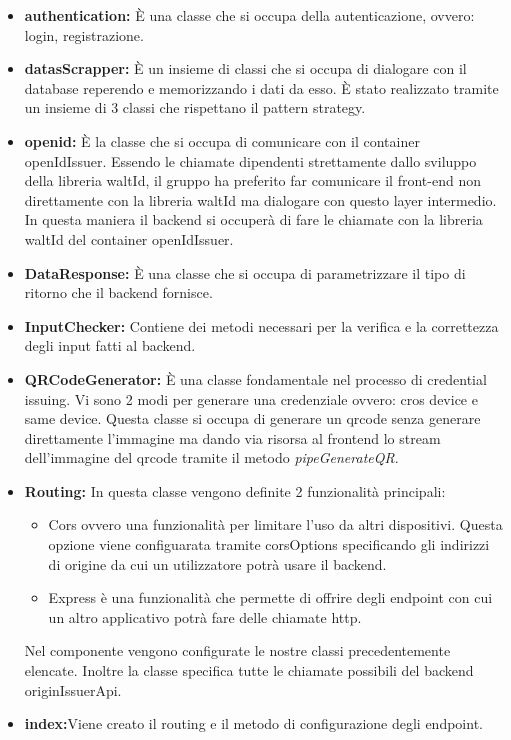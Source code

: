 \begin{itemize}
    \item \textbf{authentication:} È una classe che si occupa della autenticazione, ovvero: login, registrazione. 
    \item \textbf{datasScrapper:} È un insieme di classi che si occupa di dialogare con il database reperendo e memorizzando i dati da esso. È stato realizzato tramite un insieme di 3 classi che rispettano il pattern strategy. 
    \item \textbf{openid:} È la classe che si occupa di comunicare con il container openIdIssuer. Essendo le chiamate dipendenti strettamente dallo sviluppo della libreria waltId, il gruppo ha preferito far comunicare il front-end non direttamente con la libreria waltId ma dialogare con questo layer intermedio. In questa maniera il backend si occuperà di fare le chiamate con la libreria waltId del container openIdIssuer.
    \item \textbf{DataResponse:} È una classe che si occupa di parametrizzare il tipo di ritorno che il backend fornisce.
    \item \textbf{InputChecker:} Contiene dei metodi necessari per la verifica e la correttezza degli input fatti al backend.
    \item \textbf{QRCodeGenerator:} È una classe fondamentale nel processo di credential issuing. Vi sono 2 modi per generare una credenziale ovvero: cros device e same device. Questa classe si occupa di generare un qrcode senza generare direttamente l'immagine ma dando via risorsa al frontend lo stream dell'immagine del qrcode tramite il metodo \textit{pipeGenerateQR}.
    \item \textbf{Routing:} In questa classe vengono definite 2 funzionalità principali:
     \begin{itemize}
     \item Cors ovvero una funzionalità per limitare l'uso da altri dispositivi. Questa opzione viene configuarata tramite corsOptions specificando gli indirizzi di origine da cui un utilizzatore potrà usare il backend. 
     \item Express è una funzionalità che permette di offrire degli endpoint con cui un altro applicativo potrà fare delle chiamate http. 
     \end{itemize}
    Nel componente vengono configurate le nostre classi precedentemente elencate.
    Inoltre la classe specifica tutte le chiamate possibili del backend originIssuerApi.
    \item \textbf{index:}Viene creato il routing e il metodo di configurazione degli endpoint.
\end{itemize}

